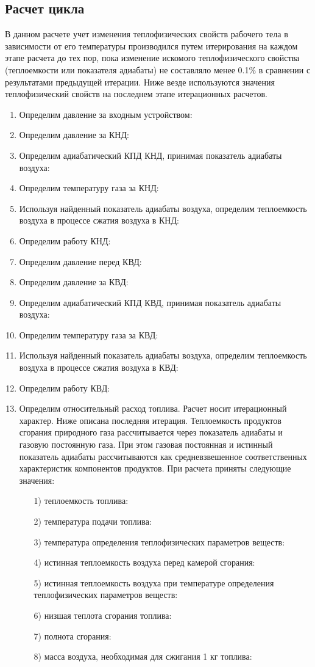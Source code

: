 \subsection{Расчет цикла}
В данном расчете учет изменения теплофизических свойств рабочего тела в зависимости от его температуры производился
путем итерирования на каждом этапе расчета до тех пор, пока изменение искомого теплофизического свойства (теплоемкости или
показателя адиабаты) не составляло менее 0.1\% в сравнении с результатами предыдущей итерации. Ниже везде используются
значения теплофизический свойств на последнем этапе итерационных расчетов.

\begin{enumerate}
	\item Определим давление за входным устройством:
	\item Определим давление за КНД:
	\item Определим адиабатический КПД КНД, принимая показатель адиабаты воздуха:
	\item Определим температуру газа за КНД:
	\item Используя найденный показатель адиабаты воздуха, определим теплоемкость воздуха в процессе сжатия воздуха в КНД:
	\item Определим работу КНД:
	\item Определим давление перед КВД:
	\item Определим давление за КВД:
	\item Определим адиабатический КПД КВД, принимая показатель адиабаты воздуха:
	\item Определим температуру газа за КВД:
	\item Используя найденный показатель адиабаты воздуха, определим теплоемкость воздуха в процессе сжатия воздуха в КВД:
	\item Определим работу КВД:
	\item Определим относительный расход топлива. Расчет носит итерационный характер. Ниже описана последняя итерация. Теплоемкость продуктов сгорания природного газа рассчитывается через показатель адиабаты и газовую постоянную газа. При этом газовая постоянная и истинный показатель адиабаты рассчитываются как средневзвешенное соответственных характеристик компонентов продуктов. При расчета приняты следующие значения:
	\begin{enumerate} %
		\item[1)] теплоемкость топлива:
		\item[2)] температура подачи топлива:
		\item[3)] температура определения теплофизических параметров веществ:
		\item[4)] истинная теплоемкость воздуха перед камерой сгорания:
		\item[5)] истинная теплоемкость воздуха при температуре определения теплофизических параметров веществ:
		\item[6)] низшая теплота сгорания топлива:
		\item[7)] полнота сгорания:
		\item[8)] масса воздуха, необходимая для сжигания 1 кг топлива:
	\end{enumerate}
	

\end{enumerate}
